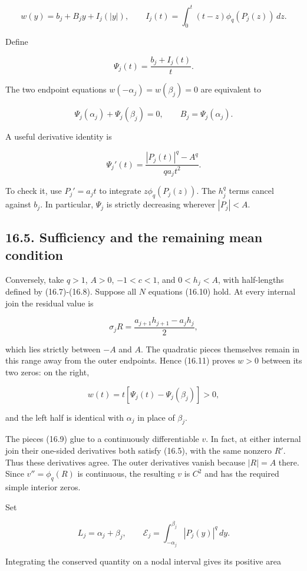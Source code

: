 \documentclass[11pt]{article}
\begin{document}
\[
w(y)=b_j+B_jy+I_j(|y|),\qquad
I_j(t)=\int_0^t(t-z)\phi_q(P_j(z))\,dz.
\tag{16.9}
\]

Define

\[
\Psi_j(t)=\frac{b_j+I_j(t)}t.
\]

The two endpoint equations \(w(-\alpha_j)=w(\beta_j)=0\) are equivalent
to

\[
\Psi_j(\alpha_j)+\Psi_j(\beta_j)=0,
\qquad B_j=\Psi_j(\alpha_j).
\tag{16.10}
\]

A useful derivative identity is

\[
\Psi_j'(t)=\frac{|P_j(t)|^q-A^q}{q a_jt^2}.
\tag{16.11}
\]

To check it, use \(P_j'=a_jt\) to integrate \(z\phi_q(P_j(z))\). The
\(h_j^q\) terms cancel against \(b_j\). In particular, \(\Psi_j\) is
strictly decreasing wherever \(|P_j|<A\).

\subsection{16.5. Sufficiency and the remaining mean
condition}\label{sufficiency-and-the-remaining-mean-condition}

Conversely, take \(q>1\), \(A>0\), \(-1<c<1\), and \(0<h_j<A\), with
half-lengths defined by (16.7)-(16.8). Suppose all \(N\) equations
(16.10) hold. At every internal join the residual value is

\[
\sigma_jR=\frac{a_{j+1}h_{j+1}-a_jh_j}{2},
\]

which lies strictly between \(-A\) and \(A\). The quadratic pieces
themselves remain in this range away from the outer endpoints. Hence
(16.11) proves \(w>0\) between its two zeros: on the right,

\[
w(t)=t[\Psi_j(t)-\Psi_j(\beta_j)]>0,
\]

and the left half is identical with \(\alpha_j\) in place of
\(\beta_j\).

The pieces (16.9) glue to a continuously differentiable \(v\). In fact,
at either internal join their one-sided derivatives both satisfy (16.5),
with the same nonzero \(R'\). Thus these derivatives agree. The outer
derivatives vanish because \(|R|=A\) there. Since \(v''=\phi_q(R)\) is
continuous, the resulting \(v\) is \(C^2\) and has the required simple
interior zeros.

Set

\[
L_j=\alpha_j+\beta_j,\qquad
\mathcal E_j=\int_{-\alpha_j}^{\beta_j}|P_j(y)|^q\,dy.
\]

Integrating the conserved quantity on a nodal interval gives its
positive area
\end{document}
